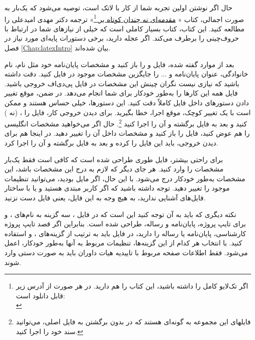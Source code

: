  حال اگر نوشتن \پ اولین تجربه شما از کار با لاتک است، توصیه می‌شود که یک‌بار به صورت اجمالی، کتاب «%
\href{http://www.tug.ctan.org/tex-archive/info/lshort/persian/lshort.pdf}{مقدمه‌ای نه چندان کوتاه بر
\lr{\LaTeXe}}\footnote{اگر تک‌لایو کامل را داشته باشید، این کتاب را هم دارید. در هر صورت از آدرس زیر قابل دانلود است:\\
}»
   ترجمه دکتر مهدی امیدعلی را مطالعه کنید. این کتاب، کتاب بسیار کاملی است که خیلی از نیازهای شما در ارتباط با حروف‌چینی را برطرف می‌کند.
اگر عجله دارید، برخی دستورات پایه‌ای مورد نیاز در فصل \ref{Chap:latexIntro} بیان شده‌اند.
 
 
بعد از موارد گفته شده، فایل 
و
را باز کنید و مشخصات پایان‌نامه خود مثل نام، نام خانوادگی، عنوان پایان‌نامه و ... را جایگزین مشخصات موجود در فایل
 کنید. دقت داشته باشید که نیازی نیست 
نگران چینش این مشخصات در فایل پی‌دی‌اف خروجی باشید. فایل 
همه این کارها را به‌طور خودکار برای شما انجام می‌دهد. در ضمن، موقع تغییر دادن دستورهای داخل فایل
 کاملاً دقت کنید. این دستورها، خیلی حساس هستند و ممکن است با یک تغییر کوچک، موقع اجرا، خطا بگیرید. برای دیدن خروجی کار، فایل 
 را 
، 
(نه 
)
کنید و بعد به فایل 
برگشته و آن را اجرا کنید
\footnote{فایلهای این مجموعه به گونه‌ای هستند که در   بدون برگشتن به فایل اصلی، می‌توانید سند خود را اجرا کنید. }.
 حال اگر می‌خواهید مشخصات انگلیسی \پ را هم عوض کنید، فایل 
را باز کنید و مشخصات داخل آن را تغییر دهید.%
 در اینجا هم برای دیدن خروجی، باید این فایل را 
کرده و بعد به فایل 
برگشته و آن را اجرا کرد.

برای راحتی بیشتر، 
فایل 
طوری طراحی شده است که کافی است فقط  یک‌بار مشخصات \پ  را وارد کنید. هر جای دیگر که لازم به درج این مشخصات باشد، این مشخصات به‌طور خودکار درج می‌شود. با این حال، اگر مایل بودید، می‌توانید تنظیمات موجود را تغییر دهید. توجه داشته باشید که اگر کاربر مبتدی هستید و یا با ساختار فایل‌های  
 آشنایی ندارید، به هیچ وجه به این فایل، یعنی فایل 
دست نزنید.

نکته دیگری که باید به آن توجه کنید این است که در فایل 
،
سه گزینه به نام‌های
،
و
برای تایپ پروژه، پایان‌نامه و رساله،
طراحی شده است. بنابراین اگر قصد تایپ پروژه کارشناسی، پایان‌نامه یا رساله را دارید، 
 در فایل 
باید به ترتیب از گزینه‌های
،
و
استفاده کنید. با انتخاب هر کدام از این گزینه‌ها، تنظیمات مربوط به آنها به‌طور خودکار، اعمل می‌شود.    
فقط اطلاعات صفحه مربوط با تاییدیه هیات داوران باید به صورت دستی وارد شوند.


